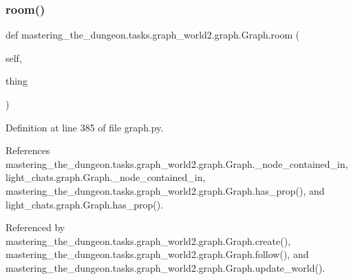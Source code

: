 \subsubsection{\texorpdfstring{room()}{room()}}
{\footnotesize\ttfamily def mastering\+\_\+the\+\_\+dungeon.\+tasks.\+graph\+\_\+world2.\+graph.\+Graph.\+room (\begin{DoxyParamCaption}\item[{}]{self,  }\item[{}]{thing }\end{DoxyParamCaption})}



Definition at line 385 of file graph.\+py.



References mastering\+\_\+the\+\_\+dungeon.\+tasks.\+graph\+\_\+world2.\+graph.\+Graph.\+\_\+node\+\_\+contained\+\_\+in, light\+\_\+chats.\+graph.\+Graph.\+\_\+node\+\_\+contained\+\_\+in, mastering\+\_\+the\+\_\+dungeon.\+tasks.\+graph\+\_\+world2.\+graph.\+Graph.\+has\+\_\+prop(), and light\+\_\+chats.\+graph.\+Graph.\+has\+\_\+prop().



Referenced by mastering\+\_\+the\+\_\+dungeon.\+tasks.\+graph\+\_\+world2.\+graph.\+Graph.\+create(), mastering\+\_\+the\+\_\+dungeon.\+tasks.\+graph\+\_\+world2.\+graph.\+Graph.\+follow(), and mastering\+\_\+the\+\_\+dungeon.\+tasks.\+graph\+\_\+world2.\+graph.\+Graph.\+update\+\_\+world().

